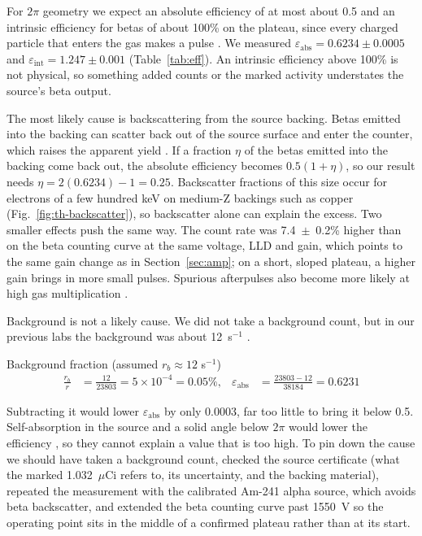 \documentclass[12pt]{article}
\begin{document}
For $2\pi$ geometry we expect an absolute efficiency of at most about 0.5 and an intrinsic efficiency for betas of about 100\% on the plateau, since every charged particle that enters the gas makes a pulse \cite{knoll}. We measured $\varepsilon_{\text{abs}} = 0.6234 \pm 0.0005$ and $\varepsilon_{\text{int}} = 1.247 \pm 0.001$ (Table~\ref{tab:eff}). An intrinsic efficiency above 100\% is not physical, so something added counts or the marked activity understates the source's beta output.

The most likely cause is backscattering from the source backing. Betas emitted into the backing can scatter back out of the source surface and enter the counter, which raises the apparent yield \cite{knoll}. If a fraction $\eta$ of the betas emitted into the backing come back out, the absolute efficiency becomes $0.5(1+\eta)$, so our result needs $\eta = 2(0.6234) - 1 = 0.25$. Backscatter fractions of this size occur for electrons of a few hundred keV on medium-Z backings such as copper (Fig.~\ref{fig:th-backscatter}), so backscatter alone can explain the excess. Two smaller effects push the same way. The count rate was 7.4~$\pm$~0.2\% higher than on the beta counting curve at the same voltage, LLD and gain, which points to the same gain change as in Section~\ref{sec:amp}; on a short, sloped plateau, a higher gain brings in more small pulses. Spurious afterpulses also become more likely at high gas multiplication \cite{knoll}.

Background is not a likely cause. We did not take a background count, but in our previous labs the background was about 12~s$^{-1}$ \cite{lab3}.

\begin{samplecalc}{Background fraction (assumed $r_b \approx 12$ s$^{-1}$)}
\begin{align*}
\frac{r_b}{r} &= \frac{12}{23803} = 5\times10^{-4} = 0.05\%, &
\varepsilon_{\text{abs}} &= \frac{23803 - 12}{38184} = 0.6231
\end{align*}
\end{samplecalc}

Subtracting it would lower $\varepsilon_{\text{abs}}$ by only 0.0003, far too little to bring it below 0.5. Self-absorption in the source and a solid angle below $2\pi$ would lower the efficiency \cite{knoll}, so they cannot explain a value that is too high. To pin down the cause we should have taken a background count, checked the source certificate (what the marked 1.032~$\mu$Ci refers to, its uncertainty, and the backing material), repeated the measurement with the calibrated Am-241 alpha source, which avoids beta backscatter, and extended the beta counting curve past 1550~V so the operating point sits in the middle of a confirmed plateau rather than at its start.
\end{document}
